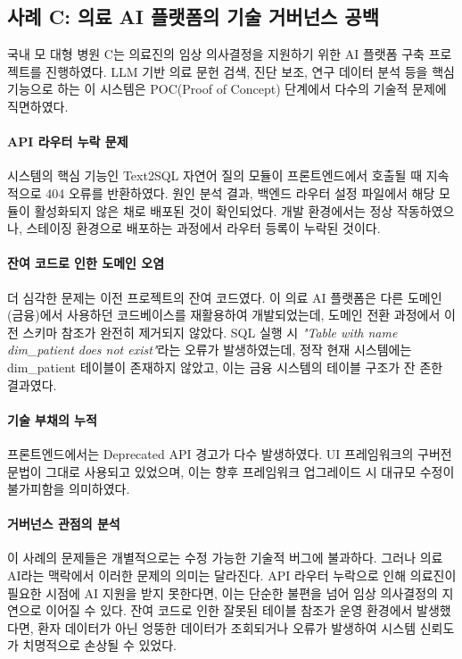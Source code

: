 \subsection{사례 C: 의료 AI 플랫폼의 기술 거버넌스 공백}
\label{sec:1.3.1}

국내 모 대형 병원 C는 의료진의 임상 의사결정을 지원하기 위한 AI 플랫폼 구축 프로젝트를 진행하였다. LLM 기반 의료 문헌 검색, 진단 보조, 연구 데이터 분석 등을 핵심 기능으로 하는 이 시스템은 POC(Proof of Concept) 단계에서 다수의 기술적 문제에 직면하였다.

\paragraph{API 라우터 누락 문제}
시스템의 핵심 기능인 Text2SQL 자연어 질의 모듈이 프론트엔드에서 호출될 때 지속적으로 404 오류를 반환하였다. 원인 분석 결과, 백엔드 라우터 설정 파일에서 해당 모듈이 활성화되지 않은 채로 배포된 것이 확인되었다. 개발 환경에서는 정상 작동하였으나, 스테이징 환경으로 배포하는 과정에서 라우터 등록이 누락된 것이다.

\paragraph{잔여 코드로 인한 도메인 오염}
더 심각한 문제는 이전 프로젝트의 잔여 코드였다. 이 의료 AI 플랫폼은 다른 도메인(금융)에서 사용하던 코드베이스를 재활용하여 개발되었는데, 도메인 전환 과정에서 이전 스키마 참조가 완전히 제거되지 않았다. SQL 실행 시 \textit{"Table with name dim\_patient does not exist"}라는 오류가 발생하였는데, 정작 현재 시스템에는 dim\_patient 테이블이 존재하지 않았고, 이는 금융 시스템의 테이블 구조가 잔 존한 결과였다.

\paragraph{기술 부채의 누적}
프론트엔드에서는 Deprecated API 경고가 다수 발생하였다. UI 프레임워크의 구버전 문법이 그대로 사용되고 있었으며, 이는 향후 프레임워크 업그레이드 시 대규모 수정이 불가피함을 의미하였다.

\paragraph{거버넌스 관점의 분석}
이 사례의 문제들은 개별적으로는 수정 가능한 기술적 버그에 불과하다. 그러나 의료 AI라는 맥락에서 이러한 문제의 의미는 달라진다. API 라우터 누락으로 인해 의료진이 필요한 시점에 AI 지원을 받지 못한다면, 이는 단순한 불편을 넘어 임상 의사결정의 지연으로 이어질 수 있다. 잔여 코드로 인한 잘못된 테이블 참조가 운영 환경에서 발생했다면, 환자 데이터가 아닌 엉뚱한 데이터가 조회되거나 오류가 발생하여 시스템 신뢰도가 치명적으로 손상될 수 있었다.

